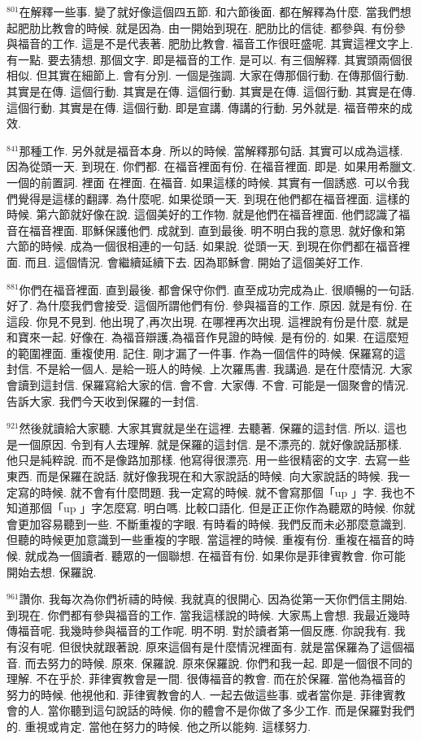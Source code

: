 \documentclass{book}
\begin{document}
$^{801}$在解釋一些事.
變了就好像這個四五節.
和六節後面.
都在解釋為什麼.
當我們想起肥肋比教會的時候.
就是因為.
由一開始到現在.
肥肋比的信徒.
都參與.
有份參與福音的工作.
這是不是代表著.
肥肋比教會.
福音工作很旺盛呢.
其實這裡文字上.
有一點.
要去猜想.
那個文字.
即是福音的工作.
是可以.
有三個解釋.
其實頭兩個很相似.
但其實在細節上.
會有分別.
一個是強調.
大家在傳那個行動.
在傳那個行動.
其實是在傳.
這個行動.
其實是在傳.
這個行動.
其實是在傳.
這個行動.
其實是在傳.
這個行動.
其實是在傳.
這個行動.
即是宣講.
傳講的行動.
另外就是.
福音帶來的成效.

$^{841}$那種工作.
另外就是福音本身.
所以的時候.
當解釋那句話.
其實可以成為這樣.
因為從頭一天.
到現在.
你們都.
在福音裡面有份.
在福音裡面.
即是.
如果用希臘文.
一個的前置詞.
裡面 在裡面.
在福音.
如果這樣的時候.
其實有一個誘惑.
可以令我們覺得是這樣的翻譯.
為什麼呢.
如果從頭一天.
到現在他們都在福音裡面.
這樣的時候.
第六節就好像在說.
這個美好的工作物.
就是他們在福音裡面.
他們認識了福音在福音裡面.
耶穌保護他們.
成就到.
直到最後.
明不明白我的意思.
就好像和第六節的時候.
成為一個很相連的一句話.
如果說.
從頭一天.
到現在你們都在福音裡面.
而且.
這個情況.
會繼續延續下去.
因為耶穌會.
開始了這個美好工作.

$^{881}$你們在福音裡面.
直到最後.
都會保守你們.
直至成功完成為止.
很順暢的一句話.
好了.
為什麼我們會接受.
這個所謂他們有份.
參與福音的工作.
原因.
就是有份.
在這段.
你見不見到.
他出現了,再次出現.
在哪裡再次出現.
這裡說有份是什麼.
就是和寶來一起.
好像在.
為福音辯護,為福音作見證的時候.
是有份的.
如果.
在這麼短的範圍裡面.
重複使用.
記住.
剛才漏了一件事.
作為一個信件的時候.
保羅寫的這封信.
不是給一個人.
是給一班人的時候.
上次羅馬書.
我講過.
是在什麼情況.
大家會讀到這封信.
保羅寫給大家的信.
會不會.
大家傳.
不會.
可能是一個聚會的情況.
告訴大家.
我們今天收到保羅的一封信.

$^{921}$然後就讀給大家聽.
大家其實就是坐在這裡.
去聽著.
保羅的這封信.
所以.
這也是一個原因.
令到有人去理解.
就是保羅的這封信.
是不漂亮的.
就好像說話那樣.
他只是純粹說.
而不是像路加那樣.
他寫得很漂亮.
用一些很精密的文字.
去寫一些東西.
而是保羅在說話.
就好像我現在和大家說話的時候.
向大家說話的時候.
我一定寫的時候.
就不會有什麼問題.
我一定寫的時候.
就不會寫那個「up 」字.
我也不知道那個「up 」字怎麼寫.
明白嗎.
比較口語化.
但是正正你作為聽眾的時候.
你就會更加容易聽到一些.
不斷重複的字眼.
有時看的時候.
我們反而未必那麼意識到.
但聽的時候更加意識到一些重複的字眼.
當這裡的時候.
重複有份.
重複在福音的時候.
就成為一個讀者.
聽眾的一個聯想.
在福音有份.
如果你是菲律賓教會.
你可能開始去想.
保羅說.

$^{961}$讚你.
我每次為你們祈禱的時候.
我就真的很開心.
因為從第一天你們信主開始.
到現在.
你們都有參與福音的工作.
當我這樣說的時候.
大家馬上會想.
我最近幾時傳福音呢.
我幾時參與福音的工作呢.
明不明.
對於讀者第一個反應.
你說我有.
我有沒有呢.
但很快就跟著說.
原來這個有是什麼情況裡面有.
就是當保羅為了這個福音.
而去努力的時候.
原來.
保羅說.
原來保羅說.
你們和我一起.
即是一個很不同的理解.
不在乎於.
菲律賓教會是一間.
很傳福音的教會.
而在於保羅.
當他為福音的努力的時候.
他視他和.
菲律賓教會的人.
一起去做這些事.
或者當你是.
菲律賓教會的人.
當你聽到這句說話的時候.
你的體會不是你做了多少工作.
而是保羅對我們的.
重視或肯定.
當他在努力的時候.
他之所以能夠.
這樣努力.
\end{document}
